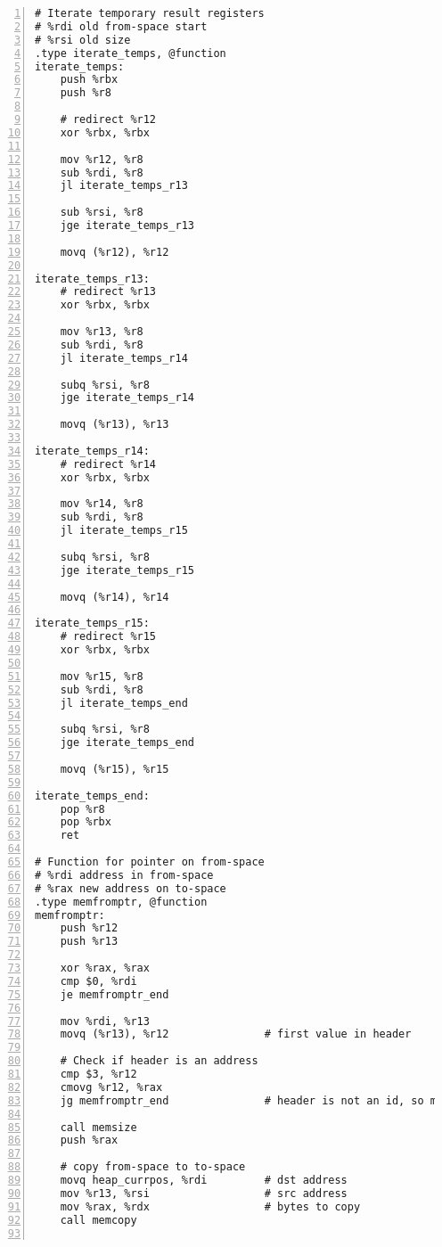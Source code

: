 \documentclass{article}
\begin{document}
\begin{lstlisting}[numbers=left, firstnumber=1]
# Iterate temporary result registers
# %rdi old from-space start
# %rsi old size
.type iterate_temps, @function
iterate_temps:
    push %rbx
    push %r8
    
    # redirect %r12
    xor %rbx, %rbx
    
    mov %r12, %r8
    sub %rdi, %r8
    jl iterate_temps_r13

    sub %rsi, %r8
    jge iterate_temps_r13
     
    movq (%r12), %r12

iterate_temps_r13:
    # redirect %r13
    xor %rbx, %rbx
    
    mov %r13, %r8
    sub %rdi, %r8
    jl iterate_temps_r14

    subq %rsi, %r8
    jge iterate_temps_r14
     
    movq (%r13), %r13

iterate_temps_r14:    
    # redirect %r14
    xor %rbx, %rbx
    
    mov %r14, %r8
    sub %rdi, %r8
    jl iterate_temps_r15

    subq %rsi, %r8
    jge iterate_temps_r15
     
    movq (%r14), %r14
 
iterate_temps_r15:   
    # redirect %r15
    xor %rbx, %rbx
    
    mov %r15, %r8
    sub %rdi, %r8
    jl iterate_temps_end

    subq %rsi, %r8
    jge iterate_temps_end
     
    movq (%r15), %r15

iterate_temps_end:    
    pop %r8
    pop %rbx
    ret

# Function for pointer on from-space
# %rdi address in from-space
# %rax new address on to-space
.type memfromptr, @function
memfromptr:
    push %r12
    push %r13
    
    xor %rax, %rax
    cmp $0, %rdi
    je memfromptr_end
    
    mov %rdi, %r13    
    movq (%r13), %r12               # first value in header
    
    # Check if header is an address
    cmp $3, %r12
    cmovg %r12, %rax
    jg memfromptr_end               # header is not an id, so must be an address
    
    call memsize    
    push %rax
    
    # copy from-space to to-space
    movq heap_currpos, %rdi         # dst address
    mov %r13, %rsi                  # src address
    mov %rax, %rdx                  # bytes to copy
    call memcopy
    

\end{lstlisting}
\end{document}
